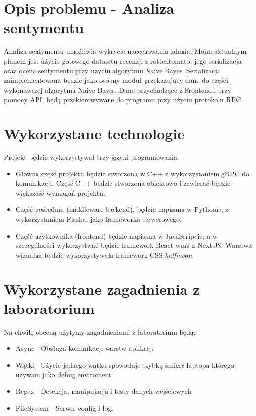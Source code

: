 \documentclass{article}
\begin{document}
\section{Opis problemu - Analiza sentymentu}

Analiza sentymentu umożliwia wykrycie nacechowania zdania.
Moim aktualnym planem jest użycie gotowego datasetu recenzji z rottentomato, jego serializacja oraz ocena sentymentu przy użyciu algorytmu Naive Bayes.
Serializacja zaimplementowana będzie jako osobny moduł przekazujący dane do części wykonawczej algorytmu Naive Bayes.
Dane przychodzące z Frontendu przy pomocy API, będą przekierowywane do programu przy użyciu protokołu RPC.

\section{Wykorzystane technologie}

Projekt będzie wykorzystywał trzy języki programowania. 

\begin{itemize}
  \item Głowna część projektu będzie stworzona w C++ z wykorzystaniem gRPC do komunikacji. Część C++ będzie stworzona obiektowo i zawierać będzie większość wymagań projektu. 
  \item Część pośrednia (middleware backend), będzie napisana w Pythonie, z wykorzystaniem Flaska, jako frameworka serwerowego. 
  \item Część użytkownika (frontend) będzie napisana w JavaScripcie, a w szczególności wykorzystwać będzie framework React wraz z Next.JS. Warstwa wizualna będzie wykorzystywała framework CSS \textit{halfmoon}. 
\end{itemize}

\section{Wykorzystane zagadnienia z laboratorium}

Na chwilę obecną użytymy zagadnieniami z laboratorium będą:
\begin{itemize}
    \item Async - Obsługa kominikacji warstw aplikacji
    \item Wątki - Użycie jednego wątku spowoduje szybką śmierć laptopa którego używam jako debug enviroment
    \item Regex - Detekcja, manipujacja i testy danych wejściowych
    \item FileSystem - Serwer config i logi
\end{itemize}
\end{document}
